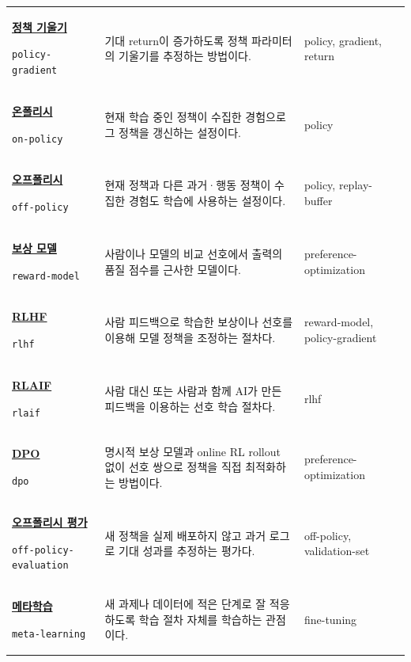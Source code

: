 \begin{longtable}{p{} p{} p{}}
\hypertarget{glossary:policy-gradient}{\hyperref[bg:policy-gradient]{\textbf{정책 기울기}}} \newline\texttt{policy-gradient} & 기대 return이 증가하도록 정책 파라미터의 기울기를 추정하는 방법이다. & \scriptsize policy, gradient, return \\
\hypertarget{glossary:on-policy}{\hyperref[bg:on-policy]{\textbf{온폴리시}}} \newline\texttt{on-policy} & 현재 학습 중인 정책이 수집한 경험으로 그 정책을 갱신하는 설정이다. & \scriptsize policy \\
\hypertarget{glossary:off-policy}{\hyperref[bg:off-policy]{\textbf{오프폴리시}}} \newline\texttt{off-policy} & 현재 정책과 다른 과거·행동 정책이 수집한 경험도 학습에 사용하는 설정이다. & \scriptsize policy, replay-buffer \\
\hypertarget{glossary:reward-model}{\hyperref[bg:reward-model]{\textbf{보상 모델}}} \newline\texttt{reward-model} & 사람이나 모델의 비교 선호에서 출력의 품질 점수를 근사한 모델이다. & \scriptsize preference-optimization \\
\hypertarget{glossary:rlhf}{\hyperref[bg:rlhf]{\textbf{RLHF}}} \newline\texttt{rlhf} & 사람 피드백으로 학습한 보상이나 선호를 이용해 모델 정책을 조정하는 절차다. & \scriptsize reward-model, policy-gradient \\
\hypertarget{glossary:rlaif}{\hyperref[bg:rlaif]{\textbf{RLAIF}}} \newline\texttt{rlaif} & 사람 대신 또는 사람과 함께 AI가 만든 피드백을 이용하는 선호 학습 절차다. & \scriptsize rlhf \\
\hypertarget{glossary:dpo}{\hyperref[bg:dpo]{\textbf{DPO}}} \newline\texttt{dpo} & 명시적 보상 모델과 online RL rollout 없이 선호 쌍으로 정책을 직접 최적화하는 방법이다. & \scriptsize preference-optimization \\
\hypertarget{glossary:off-policy-evaluation}{\hyperref[bg:off-policy-evaluation]{\textbf{오프폴리시 평가}}} \newline\texttt{off-policy-evaluation} & 새 정책을 실제 배포하지 않고 과거 로그로 기대 성과를 추정하는 평가다. & \scriptsize off-policy, validation-set \\
\hypertarget{glossary:meta-learning}{\hyperref[bg:meta-learning]{\textbf{메타학습}}} \newline\texttt{meta-learning} & 새 과제나 데이터에 적은 단계로 잘 적응하도록 학습 절차 자체를 학습하는 관점이다. & \scriptsize fine-tuning \\

\end{longtable}

